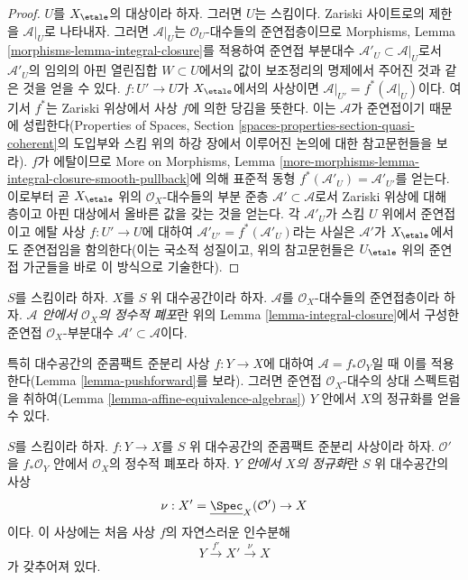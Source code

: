 \begin{proof}
$U$를 $X_\etale$의 대상이라 하자. 그러면 $U$는 스킴이다. Zariski
사이트로의 제한을 $\mathcal{A}|_U$로 나타내자. 그러면
$\mathcal{A}|_U$는 $\mathcal{O}_U$-대수들의 준연접층이므로 Morphisms,
Lemma \ref{morphisms-lemma-integral-closure}를 적용하여 준연접 부분대수
$\mathcal{A}'_U \subset \mathcal{A}|_U$로서 $\mathcal{A}'_U$의 임의의 아핀
열린집합 $W \subset U$에서의 값이 보조정리의 명제에서 주어진 것과 같은 것을
얻을 수 있다. $f : U' \to U$가 $X_\etale$에서의 사상이면
$\mathcal{A}|_{U'} = f^*(\mathcal{A}|_U)$이다. 여기서 $f^*$는 Zariski
위상에서 사상 $f$에 의한 당김을 뜻한다. 이는 $\mathcal{A}$가
준연접이기 때문에 성립한다(Properties of Spaces, Section
\ref{spaces-properties-section-quasi-coherent}의 도입부와 스킴 위의
하강 장에서 이루어진 논의에 대한 참고문헌들을 보라). $f$가 에탈이므로
More on Morphisms, Lemma
\ref{more-morphisms-lemma-integral-closure-smooth-pullback}에 의해 표준적
동형
$f^*(\mathcal{A}'_U) = \mathcal{A}'_{U'}$를 얻는다. 이로부터 곧
$X_\etale$ 위의 $\mathcal{O}_X$-대수들의 부분 준층
$\mathcal{A}' \subset \mathcal{A}$로서 Zariski 위상에 대해 층이고 아핀
대상에서 올바른 값을 갖는 것을 얻는다. 각 $\mathcal{A}'_U$가 스킴
$U$ 위에서 준연접이고 에탈 사상 $f : U' \to U$에 대하여
$\mathcal{A}'_{U'} = f^*(\mathcal{A}'_U)$라는 사실은 $\mathcal{A}'$가
$X_\etale$에서도 준연접임을 함의한다(이는 국소적 성질이고, 위의
참고문헌들은 $U_\etale$ 위의 준연접 가군들을 바로 이 방식으로
기술한다).
\end{proof}

\begin{definition}
\label{definition-integral-closure}
$S$를 스킴이라 하자. $X$를 $S$ 위 대수공간이라 하자.
$\mathcal{A}$를 $\mathcal{O}_X$-대수들의 준연접층이라 하자.
{\it $\mathcal{A}$ 안에서 $\mathcal{O}_X$의 정수적 폐포}란 위의 Lemma
\ref{lemma-integral-closure}에서 구성한 준연접 $\mathcal{O}_X$-부분대수
$\mathcal{A}' \subset \mathcal{A}$이다.
\end{definition}

\noindent
특히 대수공간의 준콤팩트 준분리 사상 $f : Y \to X$에 대하여
$\mathcal{A} = f_*\mathcal{O}_Y$일 때 이를 적용한다(Lemma
\ref{lemma-pushforward}를 보라). 그러면 준연접 $\mathcal{O}_X$-대수의
상대 스펙트럼을 취하여(Lemma \ref{lemma-affine-equivalence-algebras})
$Y$ 안에서 $X$의 정규화를 얻을 수 있다.

\begin{definition}
\label{definition-normalization-X-in-Y}
$S$를 스킴이라 하자. $f : Y \to X$를 $S$ 위 대수공간의 준콤팩트
준분리 사상이라 하자. $\mathcal{O}'$을 $f_*\mathcal{O}_Y$ 안에서
$\mathcal{O}_X$의 정수적 폐포라 하자. {\it $Y$ 안에서 $X$의 정규화}란
$S$ 위 대수공간의 사상
$$
\nu : X' = \underline{\Spec}_X(\mathcal{O}') \to X
$$
이다. 이 사상에는 처음 사상 $f$의 자연스러운 인수분해
$$
Y \xrightarrow{f'} X' \xrightarrow{\nu} X
$$
가 갖추어져 있다.
\end{definition}

